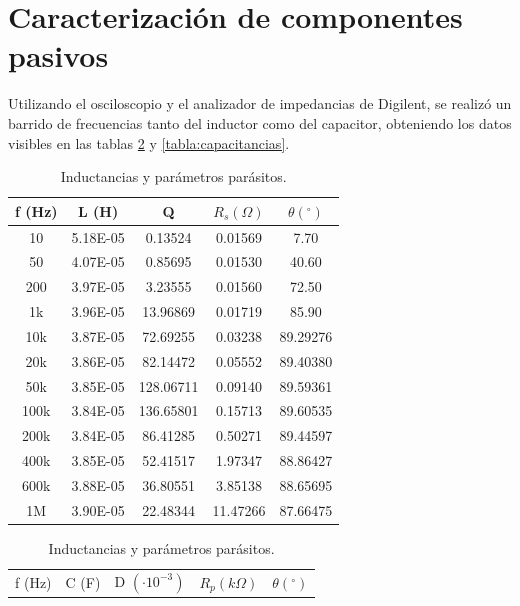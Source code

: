 \section{Caracterización de componentes pasivos} \label{seccion3}

Utilizando el osciloscopio y el analizador de impedancias de Digilent, se realizó un barrido de frecuencias tanto del inductor como del capacitor, obteniendo los datos visibles en las tablas \ref{tabla:inductancias} y \ref{tabla:capacitancias}.

\begin{table}[H]
\centering

\begin{minipage}{0.48\textwidth}
    \centering
    \scriptsize
    \begin{tabular}{ccccc}
    \toprule
    f (Hz) & L (H) & Q & $R_s (\Omega)$ & $\theta (^\circ)$ \\
    \midrule
    10     & 5.18E-05 & 0.13524 & 0.01569 & 7.70 \\
    50     & 4.07E-05 & 0.85695 & 0.01530 & 40.60 \\
    200    & 3.97E-05 & 3.23555 & 0.01560 & 72.50 \\
    1k     & 3.96E-05 & 13.96869 & 0.01719 & 85.90 \\
    10k    & 3.87E-05 & 72.69255 & 0.03238 & 89.29276 \\
    20k    & 3.86E-05 & 82.14472 & 0.05552 & 89.40380 \\
    50k    & 3.85E-05 & 128.06711 & 0.09140 & 89.59361 \\
    100k   & 3.84E-05 & 136.65801 & 0.15713 & 89.60535 \\
    200k   & 3.84E-05 & 86.41285 & 0.50271 & 89.44597 \\
    400k   & 3.85E-05 & 52.41517 & 1.97347 & 88.86427 \\
    600k   & 3.88E-05 & 36.80551 & 3.85138 & 88.65695 \\
    1M     & 3.90E-05 & 22.48344 & 11.47266 & 87.66475 \\
    \bottomrule
    \end{tabular}
    \caption{Inductancias y parámetros parásitos.}
    \label{tabla:inductancias}
\end{minipage}
\hfill
\begin{minipage}{0.48\textwidth}
    \centering
    \scriptsize
    \begin{tabular}{ccccc}
    \toprule
    f (Hz) & C (F) & D $(\cdot10^{-3})$ & $R_p (k\Omega)$ & $\theta (^\circ)$ \\

\end{tabular}
\end{minipage}
\end{table}
